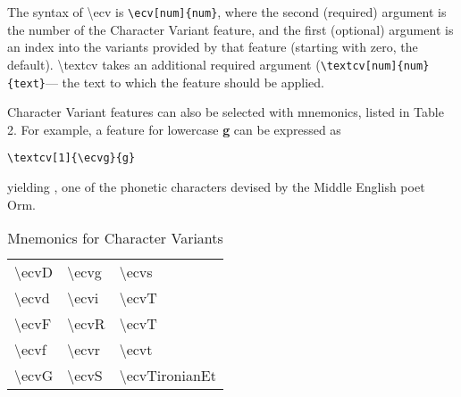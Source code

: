 \documentclass[12pt]{article}
\begin{document}
The syntax of \textbackslash ecv
is {\color{BrickRed}\verb|\ecv[num]{num}|}, where the second (required) argument is the number of the Character Variant feature,
and the first (optional) argument is an index into the variants provided by that feature (starting with zero, the default).
\textbackslash textcv takes an additional required argument ({\color{BrickRed}\verb|\textcv[num]{num}{text}|}— the text to which the
feature should be applied.

Character Variant features can also be selected with mnemonics, listed in Table 2. For example, a feature for
lowercase \textbf{g} can be expressed as

\begin{center}
{\color{BrickRed}\small\verb|\textcv[1]{\ecvg}{g}|}
\end{center}

\noindent yielding \textbf{}, one of the phonetic characters devised by
the Middle English poet Orm.

\begin{table}[ht]
    \centering
    \begin{tabular}{|l|l|l|}
    \hline
    \textbackslash ecvD & \textbackslash ecvg & \textbackslash ecvs\\

    \textbackslash ecvd & \textbackslash ecvi & \textbackslash ecvT\\

    \textbackslash ecvF & \textbackslash ecvR & \textbackslash ecvT\\

    \textbackslash ecvf & \textbackslash ecvr & \textbackslash ecvt\\

    \textbackslash ecvG & \textbackslash ecvS & \textbackslash ecvTironianEt\\
    \hline
\end{tabular}
\caption{Mnemonics for Character Variants}
\end{table}
\end{document}

